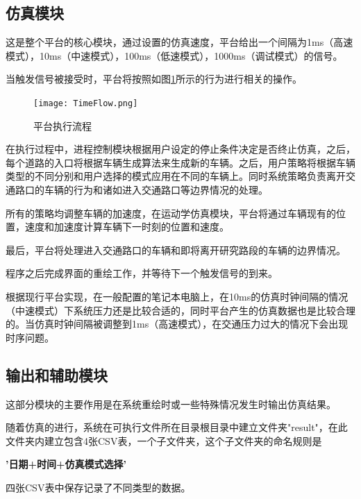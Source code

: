 \documentclass[a4paper,UTF8]{paper}
\begin{document}
\subsection{仿真模块}
这是整个平台的核心模块，通过设置的仿真速度，平台给出一个间隔为1ms（高速模式），10ms（中速模式），100ms（低速模式），1000ms（调试模式）的信号。

当触发信号被接受时，平台将按照如图\ref{int}所示的行为进行相关的操作。

\begin{figure}
\centering
\texttt{[image: TimeFlow.png]}
\caption{平台执行流程}
\label{int}
\end{figure}

在执行过程中，进程控制模块根据用户设定的停止条件决定是否终止仿真，之后，每个道路的入口将根据车辆生成算法来生成新的车辆。之后，用户策略将根据车辆类型的不同分别和用户选择的模式应用在不同的车辆上。同时系统策略负责离开交通路口的车辆的行为和诸如进入交通路口等边界情况的处理。

所有的策略均调整车辆的加速度，在运动学仿真模块，平台将通过车辆现有的位置，速度和加速度计算车辆下一时刻的位置和速度。

最后，平台将处理进入交通路口的车辆和即将离开研究路段的车辆的边界情况。

程序之后完成界面的重绘工作，并等待下一个触发信号的到来。

根据现行平台实现，在一般配置的笔记本电脑上，在10ms的仿真时钟间隔的情况（中速模式）下系统压力还是比较合适的，同时平台产生的仿真数据也是比较合理的。当仿真时钟间隔被调整到1ms（高速模式），在交通压力过大的情况下会出现时序问题。

\subsection{输出和辅助模块}
这部分模块的主要作用是在系统重绘时或一些特殊情况发生时输出仿真结果。

随着仿真的进行，系统在可执行文件所在目录根目录中建立文件夹"result"，在此文件夹内建立包含4张CSV表，一个子文件夹，这个子文件夹的命名规则是

\centerline{\textbf{'日期+时间+仿真模式选择'}}

四张CSV表中保存记录了不同类型的数据。
\end{document}

